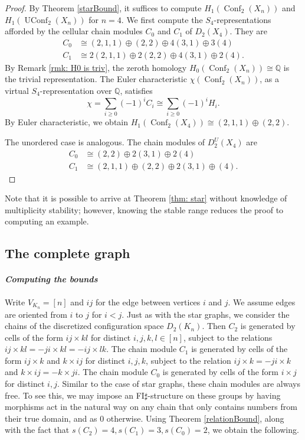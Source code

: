 \documentclass[12pt]{amsart}
\theoremstyle{definition}
\newcommand{\Q}{\mathbb{Q}}
\newcommand{\conf}{\operatorname{Conf}}
\newcommand{\uconf}{\operatorname{UConf}}
\begin{document}
\begin{proof}
By Theorem \ref{starBound}, it suffices to compute $H_1(\conf_2(X_n))$ and $H_1(\uconf_2(X_n))$ for $n=4$. We first compute the $S_4$-representations afforded by the cellular chain modules $C_0$ and $C_1$ of $D_2(X_4)$. They are
\begin{align*}
    C_0 &\cong (2,1,1) \oplus (2,2) \oplus 4(3,1) \oplus 3(4) \\
    C_1 &\cong 2(2,1,1) \oplus 2(2,2) \oplus 4(3,1) \oplus 2(4).
\end{align*}
By Remark \ref{rmk: H0 is triv}, the zeroth homology $H_0(\conf_2(X_n)) \cong \Q$ is the trivial representation. The Euler characteristic $\chi(\conf_2(X_n))$, as a virtual $S_4$-representation over $\Q$, satisfies \[\chi = \sum_{i\geq0}(-1)^i C_i \cong \sum_{i\geq0}(-1)^i H_i.\] By Euler characteristic, we obtain $H_1(\conf_2(X_4)) \cong (2,1,1) \oplus (2,2)$. %

The unordered case is analogous. The chain modules of $D^U_2(X_4)$ are 
\begin{align*}
    C_0 &\cong (2,2) \oplus 2(3,1) \oplus 2(4) \\
    C_1 &\cong (2,1,1) \oplus (2,2) \oplus 2(3,1) \oplus (4).
\end{align*}
\end{proof}

Note that it is possible to arrive at Theorem \ref{thm: star} without knowledge of multiplicity stability; however, knowing the stable range reduces the proof to computing an example.

\subsection{The complete graph}

\paragraph{\textit{Computing the bounds}}

Write $V_{K_n}=[n]$ and ${ij}$ for the edge between vertices $i$ and $j$. We assume edges are oriented from $i$ to $j$ for $i<j$. Just as with the star graphs, we consider the chains of the discretized configuration space $D_2(K_n)$. Then $C_2$ is generated by cells of the form ${ij}\times{kl}$ for distinct $i,j,k,l\in[n]$, subject to the relations ${ij}\times{kl} = -{ji}\times{kl} = -{ij}\times{lk}$. The chain module $C_1$ is generated by cells of the form ${ij}\times k$ and $k \times {ij}$ for distinct $i,j,k$, subject to the relation ${ij}\times k = -{ji}\times k$ and $k\times {ij}= -k\times {ji}$. The chain module $C_0$ is generated by cells of the form $i\times j$ for distinct $i,j$. Similar to the case of star graphs, these chain modules are always free. To see this, we may impose an FI$\sharp$-structure on these groups by having morphisms act in the natural way on any chain that only contains numbers from their true domain, and as 0 otherwise. Using Theorem \ref{relationBound}, along with the fact that $s(C_2) = 4, s(C_1) = 3, s(C_0) = 2$, we obtain the following.
\end{document}
